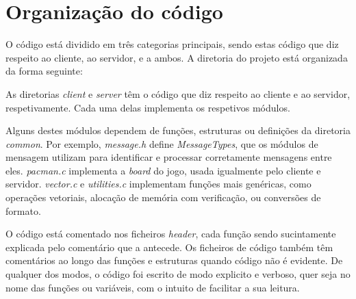 \documentclass[a4paper]{report}
\begin{document}
    \section{Organização do código}
        \par O código está dividido em três categorias principais, sendo estas código que diz respeito ao cliente, ao servidor, e a ambos. A diretoria do projeto está organizada da forma seguinte:

        \begin{figure}[H]
            \label{}
        \end{figure}

        \par As diretorias \textit{client} e \textit{server} têm o código que diz respeito ao cliente e ao servidor, respetivamente. Cada uma delas implementa os respetivos módulos. 
        \par Alguns destes módulos dependem de funções, estruturas ou definições da diretoria \textit{common}. Por exemplo, \textit{message.h} define \textit{MessageTypes}, que os módulos de mensagem utilizam para identificar e processar corretamente mensagens entre eles. \textit{pacman.c} implementa a \textit{board} do jogo, usada igualmente pelo cliente e servidor. \textit{vector.c} e \textit{utilities.c} implementam funções mais genéricas, como operações vetoriais, alocação de memória com verificação, ou conversões de formato.
        \par O código está comentado nos ficheiros \textit{header}, cada função sendo sucintamente explicada pelo comentário que a antecede. Os ficheiros de código também têm comentários ao longo das funções e estruturas quando código não é evidente. De qualquer dos modos, o código foi escrito de modo explicito e verboso, quer seja no nome das funções ou variáveis, com o intuito de facilitar a sua leitura.
\end{document}
